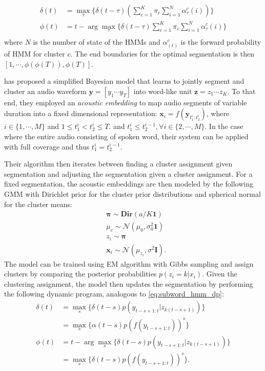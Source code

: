 \documentclass[journal]{IEEEtran}
\begin{document}
\begin{align}\label{eq:subword_hmm_dp}
    \delta(t) &= \max_{\tau}\{\delta(t-\tau) (\sum_{c=1}^K\pi_c \sum_{i=1}^{N}\alpha^c_{\tau}(i))\} \\
    \phi(t) &= t - \arg \max_{\tau}\{\delta(t-\tau)\sum_{c=1}^K\pi_c \sum_{i=1}^{N}\alpha^c_{\tau}(i)\} \\
\end{align}
where $N$ is the number of state of the HMMs and $\alpha^c_(t)$ is the forward probability of HMM for cluster $c$. The end boundaries for the optimal segmentation is then $[1, \cdots, \phi(\phi(T)), \phi(T)]$.

\cite{Kamper2017} has proposed a simplified Bayesian model that learns to jointly segment and cluster an audio waveform $\mathbf y = [y_1 \cdots y_T]$ into word-like unit $\mathbf z = z_1 \cdots z_K$. To that end, they employed an \textit{acoustic embedding} to map audio segments of variable duration into a fixed dimensional representation: $\mathbf x_i = f(\mathbf y_{t_1^i:t_2^i})$, where $i \in \{1, \cdots, M\}$ and $1 \leq t_1^i < t_2^i \leq T$. and $t_1^i \leq t_2^{i-1}, \forall i \in \{2, \cdots, M\}$. In the case where the entire audio consisting of spoken word, their system can be applied with full coverage and thus $t_1^i = t_2^{i-1}$. 

Their algorithm then iterates between finding a cluster assignment given segmentation and adjusting the segmentation given a cluster assignment. For a fixed segmentation, the acoustic embeddings are then modeled by the following GMM with Dirichlet prior for the cluster prior distributions and spherical normal for the cluster means: 
\begin{align}\label{eq:generate_bes_gmm}
    & \mathbf \pi \sim \mathbf{Dir}(a/K \mathbf 1)\\
    & \mu_c \sim \mathcal N(\mu_0, \sigma_0^2 \mathbf 1) \\
    & z_i \sim \mathbf \pi \\
    & \mathbf x_i \sim \mathcal N(\mu_{z_i}, \sigma^2 \mathbf I).
\end{align}
The model can be trained using EM algorithm with Gibbs sampling and assign clusters by comparing the posterior probabilities $p(z_i=k|x_i)$. Given the clustering assignment, the model then updates the segmentation by performing the following dynamic program, analogous to \ref{eq:subword_hmm_dp}:
\begin{align}\label{eq:bes_gmm_dp}
    \delta(t) &= \max_{s}\{\delta(t-s) p(y_{t-s+1:t}|z_{k(t-s+1)})\} \\
    &= \max_s \{\alpha(t-s) p(f(y_{t-s+1:t}))^s\}\\
    \phi(t) &= t - \arg \max_{s}\{\delta(t-s) p(y_{t-s+1:t}|z_{k(t-s+1)})\} \\
    &= \max_s \{\delta(t-s) p(f(y_{t-s+1:t}))^s\}.
\end{align}
\end{document}
